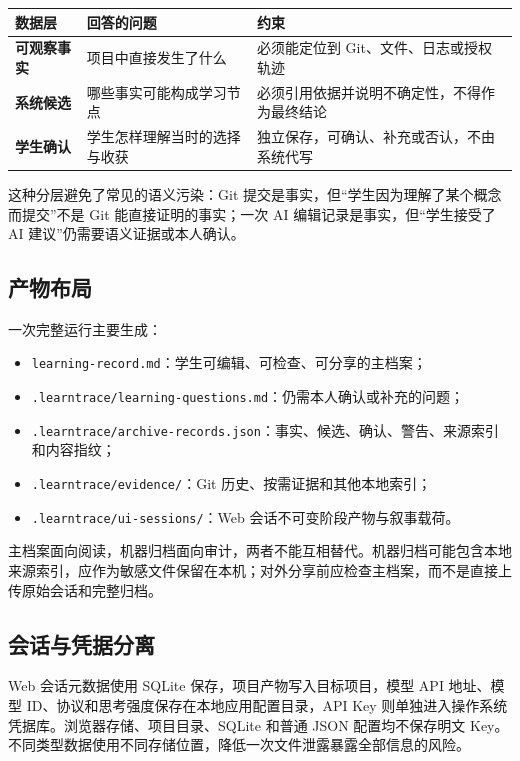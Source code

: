 \documentclass[UTF8,a4paper,12pt]{ctexart}
\begin{document}
\begin{center}
\small
\begin{tabularx}{\textwidth}{>{\bfseries}p{}X X}
\toprule
数据层 & 回答的问题 & 约束 \\
\midrule
可观察事实 & 项目中直接发生了什么 & 必须能定位到 Git、文件、日志或授权轨迹 \\
系统候选 & 哪些事实可能构成学习节点 & 必须引用依据并说明不确定性，不得作为最终结论 \\
学生确认 & 学生怎样理解当时的选择与收获 & 独立保存，可确认、补充或否认，不由系统代写 \\
\bottomrule
\end{tabularx}
\end{center}

这种分层避免了常见的语义污染：Git 提交是事实，但“学生因为理解了某个概念而提交”不是 Git 能直接证明的事实；一次 AI 编辑记录是事实，但“学生接受了 AI 建议”仍需要语义证据或本人确认。

\subsection{产物布局}

一次完整运行主要生成：

\begin{itemize}
  \item \texttt{learning-record.md}：学生可编辑、可检查、可分享的主档案；
  \item \texttt{.learntrace/learning-questions.md}：仍需本人确认或补充的问题；
  \item \texttt{.learntrace/archive-records.json}：事实、候选、确认、警告、来源索引和内容指纹；
  \item \texttt{.learntrace/evidence/}：Git 历史、按需证据和其他本地索引；
  \item \texttt{.learntrace/ui-sessions/}：Web 会话不可变阶段产物与叙事载荷。
\end{itemize}

主档案面向阅读，机器归档面向审计，两者不能互相替代。机器归档可能包含本地来源索引，应作为敏感文件保留在本机；对外分享前应检查主档案，而不是直接上传原始会话和完整归档。

\subsection{会话与凭据分离}

Web 会话元数据使用 SQLite 保存，项目产物写入目标项目，模型 API 地址、模型 ID、协议和思考强度保存在本地应用配置目录，API Key 则单独进入操作系统凭据库。浏览器存储、项目目录、SQLite 和普通 JSON 配置均不保存明文 Key。不同类型数据使用不同存储位置，降低一次文件泄露暴露全部信息的风险。
\end{document}
